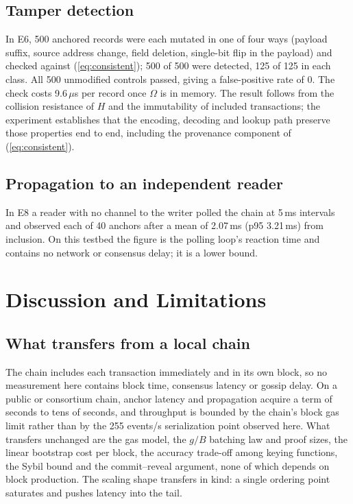\documentclass[conference]{IEEEtran}
\newcommand{\Obs}{\Omega}
\begin{document}
\subsection{Tamper detection}
In E6, 500 anchored records were each mutated in one of four ways (payload suffix, source address change, field deletion, single-bit flip in the payload) and checked against (\ref{eq:consistent}); 500 of 500 were detected, 125 of 125 in each class. All 500 unmodified controls passed, giving a false-positive rate of 0. The check costs 9.6\,$\mu$s per record once $\Obs$ is in memory. The result follows from the collision resistance of $H$ and the immutability of included transactions; the experiment establishes that the encoding, decoding and lookup path preserve those properties end to end, including the provenance component of (\ref{eq:consistent}).

\subsection{Propagation to an independent reader}
In E8 a reader with no channel to the writer polled the chain at 5\,ms intervals and observed each of 40 anchors after a mean of 2.07\,ms (p95 3.21\,ms) from inclusion. On this testbed the figure is the polling loop's reaction time and contains no network or consensus delay; it is a lower bound.

\section{Discussion and Limitations}
\label{sec:discussion}

\subsection{What transfers from a local chain}
\label{sec:transfer}
The chain includes each transaction immediately and in its own block, so no measurement here contains block time, consensus latency or gossip delay. On a public or consortium chain, anchor latency and propagation acquire a term of seconds to tens of seconds, and throughput is bounded by the chain's block gas limit rather than by the 255 events/s serialization point observed here. What transfers unchanged are the gas model, the $g/B$ batching law and proof sizes, the linear bootstrap cost per block, the accuracy trade-off among keying functions, the Sybil bound and the commit--reveal argument, none of which depends on block production. The scaling shape transfers in kind: a single ordering point saturates and pushes latency into the tail.
\end{document}
